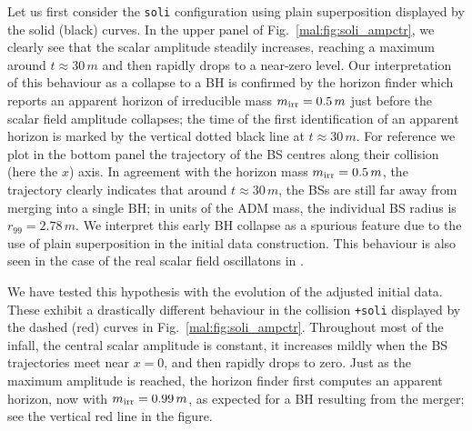 %
Let us first consider the {\tt soli} configuration using plain
superposition displayed by the solid (black) curves. In the upper
panel of Fig.~\ref{mal:fig:soli_ampctr}, we clearly see
that the scalar amplitude steadily increases, reaching a maximum
around $t\approx 30\,m$ and then rapidly drops to a near-zero level.
Our interpretation of this behaviour as a collapse to a BH is confirmed
by the horizon finder which reports an apparent horizon of irreducible
mass $m_{\rm irr}=0.5\,m$ just before the scalar field amplitude
collapses; the time of the first identification of an apparent horizon
is marked by the vertical dotted black line at $t\approx 30\,m$.
For reference we plot in the bottom panel the trajectory of the BS centres
along their collision (here the $x$) axis. In agreement with the
horizon mass $m_{\rm irr}=0.5\,m$, the trajectory clearly indicates
that around $t\approx 30\,m$, the BSs are still far away from merging
into a single BH; in units of the ADM mass,
the individual BS radius is $r_{99}=2.78\,m$. We interpret
this early BH collapse as a spurious feature due to the use of
plain superposition in the initial data construction.
This behaviour is also seen in the case of the real scalar
field oscillatons in \cite{Helfer:2018vtq}.

We have tested this hypothesis with the evolution
of the adjusted initial data.
These exhibit a drastically different behaviour
in the collision {\tt +soli} displayed by the dashed (red) curves in
Fig.~\ref{mal:fig:soli_ampctr}.
Throughout most of the infall, the central scalar amplitude
is constant, it increases mildly when the BS trajectories meet near $x=0$,
and then rapidly drops to zero. Just as the maximum amplitude is reached,
the horizon finder first computes an apparent horizon, now with 
$m_{\rm irr}=0.99\,m$, as expected for a BH resulting from the merger;
see the vertical red line in the figure.

